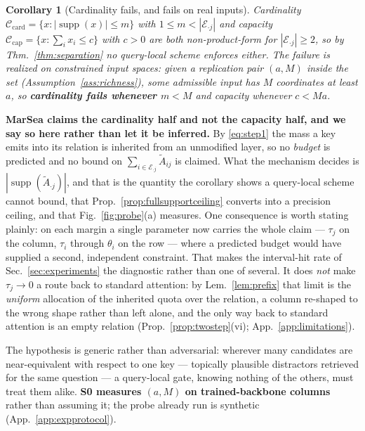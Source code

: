 \documentclass{article}
\newtheorem{corollary}{Corollary}
\newcommand{\supp}{\operatorname{supp}}
\begin{document}
\begin{corollary}[Cardinality fails, and fails on real inputs]
\label{cor:capacity}
Cardinality $\mathcal{C}_{\mathrm{card}}=\{x:|\supp(x)|\le m\}$ with $1\le m<|\mathcal{E}_{\cdot j}|$
and capacity $\mathcal{C}_{\mathrm{cap}}=\{x:\sum_i x_i\le c\}$ with $c>0$ are both
non-product-form for $|\mathcal{E}_{\cdot j}|\ge2$, so by Thm.~\ref{thm:separation} no query-local
scheme enforces either. The failure is realized on constrained input spaces: given a replication
pair $(a,M)$ inside the set (Assumption~\ref{ass:richness}), some admissible input has $M$
coordinates at least $a$, so \textbf{cardinality fails whenever $m<M$} and capacity whenever
$c<Ma$.
\end{corollary}

\textbf{MarSea claims the cardinality half and not the capacity half, and we say so here rather
than let it be inferred.} By \eqref{eq:step1} the mass a key emits into its relation is inherited
from an unmodified layer, so no \emph{budget} is predicted and no bound on
$\sum_{i\in\mathcal{E}_{\cdot j}}\tilde A_{ij}$ is claimed. What the mechanism decides is
$|\supp(\tilde A_{\cdot j})|$, and that is the quantity the corollary shows a query-local scheme
cannot bound, that Prop.~\ref{prop:fullsupportceiling} converts into a precision ceiling, and that
Fig.~\ref{fig:probe}(a) measures. One consequence is worth stating plainly: on each margin a
single parameter now carries the whole claim --- $\tau_j$ on the column, $\tau_i$ through
$\theta_i$ on the row --- where a predicted budget would have supplied a second, independent
constraint. That makes the interval-hit rate of Sec.~\ref{sec:experiments} the diagnostic rather
than one of several. It does \emph{not} make $\tau_j\to0$ a route back to standard attention:
by Lem.~\ref{lem:prefix} that limit is the \emph{uniform} allocation of the inherited quota
over the relation, a column re-shaped to the wrong shape rather than left alone, and the only
way back to standard attention is an empty relation (Prop.~\ref{prop:twostep}(vi);
App.~\ref{app:limitations}).

The hypothesis is generic rather than adversarial: wherever many candidates are near-equivalent
with respect to one key --- topically plausible distractors retrieved for the same question --- a
query-local gate, knowing nothing of the others, must treat them alike. \textbf{S0 measures
$(a,M)$ on trained-backbone columns} rather than assuming it; the probe already run is synthetic
(App.~\ref{app:expprotocol}).
\end{document}
